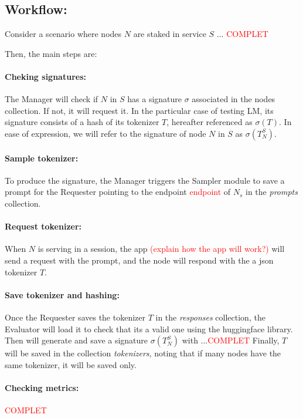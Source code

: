 \subsection{Workflow:}

Consider a scenario where nodes $N$ are staked in service $S$ ... \textcolor{red}{COMPLET}

Then, the main steps are:


\paragraph{Cheking signatures:}
The Manager will check if $N$ in $S$ has a signature $\sigma$ associated in the nodes collection. 
If not, it will request it. 
In the particular case of testing \gls{LM}, its signature consists of a hash of its tokenizer $T$, hereafter referenced as $\sigma(T)$. 
In ease of expression, we will refer to the signature of node $N$ in $S$ as $\sigma(T_{N}^{S})$. 


\paragraph{Sample tokenizer:}
To produce the signature, the Manager triggers the Sampler module to save a prompt for the Requester pointing to the endpoint \textcolor{red}{endpoint} of $N_s$ in the \textit{prompts} collection.


\paragraph{Request tokenizer:}
When $N$ is serving in a session, the app \textcolor{red}{(explain how the app will work?)} will send a request with the prompt, and the node will respond with the a json tokenizer $T$. 


\paragraph{Save tokenizer and hashing:}
Once the Requester saves the tokenizer $T$ in the \textit{responses} collection, the Evaluator will load it to check that its a valid one using the huggingface library. 
Then will generate and save a signature $\sigma(T_{N}^{S})$ with ...\textcolor{red}{COMPLET}
Finally, $T$ will be saved in the collection \textit{tokenizers}, noting that if many nodes have the same tokenizer, it will be saved only. 


\paragraph{Checking metrics:}
\textcolor{red}{COMPLET}


